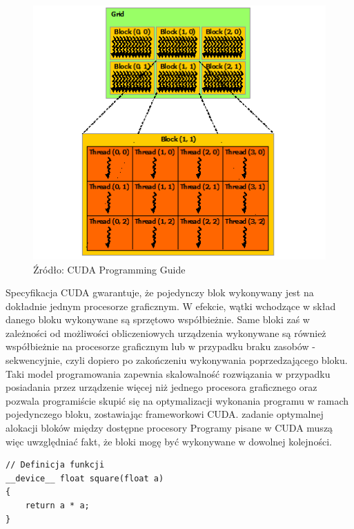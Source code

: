 \begin{figure}[H]
\centering
\includegraphics[scale=0.8]{images/grid-of-thread-blocks.png}
\caption{Źródło: CUDA Programming Guide}
\label{grid}
\end{figure}

Specyfikacja CUDA gwarantuje, że pojedynczy blok wykonywany jest na
dokładnie jednym procesorze graficznym. W efekcie, wątki wchodzące w
skład danego bloku wykonywane są sprzętowo współbieżnie. Same bloki zaś w zależności od
możliwości obliczeniowych urządzenia wykonywane są również
współbieżnie na procesorze graficznym lub w przypadku braku zasobów -
sekwencyjnie, czyli dopiero po
zakończeniu wykonywania poprzedzającego bloku. Taki model programowania zapewnia
skalowalność rozwiązania w przypadku posiadania przez urządzenie więcej niż
jednego procesora graficznego oraz pozwala programiście skupić się na
optymalizacji wykonania programu w ramach pojedynczego bloku, zostawiając frameworkowi CUDA.
zadanie optymalnej alokacji bloków między dostępne procesory 
 Programy pisane w CUDA muszą więc uwzględniać fakt,
że bloki mogę być wykonywane w dowolnej kolejności. 


\begin{lstlisting}[caption=Funkcje CUDA, label=cudafunc]
// Definicja funkcji
__device__ float square(float a)
{
	return a * a;
}
\end{lstlisting}

